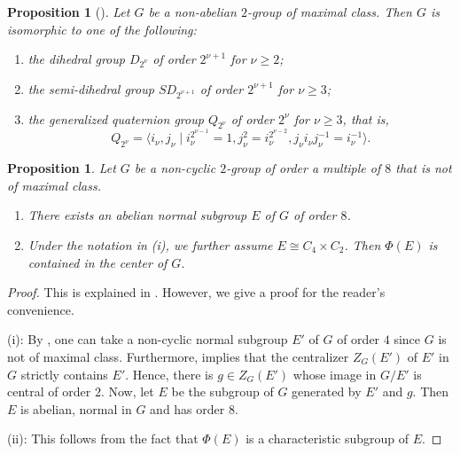 \documentclass[12pt]{amsart}
\theoremstyle{plain}
\newtheorem{prop}[thm]{Proposition}
\theoremstyle{definition}
\numberwithin{thm}{section}
\numberwithin{equation}{section}
\begin{document}
\begin{prop}[{\cite[Corollary 1.7]{Berkovich2008}}]\label{prop:clmc}
Let $G$ be a non-abelian $2$-group of maximal class. Then $G$ is isomorphic to one of the following: 
\begin{enumerate}
\item the dihedral group $D_{2^{\nu}}$ of order $2^{\nu+1}$ for $\nu \geq 2$; 
\item the semi-dihedral group $SD_{2^{\nu+1}}$ of order $2^{\nu+1}$ for $\nu \geq 3$; 
\item the generalized quaternion group $Q_{2^{\nu}}$ of order $2^{\nu}$ for $\nu \geq 3$, that is,
\begin{equation*}
    Q_{2^{\nu}}=\langle i_{\nu},j_{\nu}\mid i_{\nu}^{2^{\nu-1}}=1,j_{\nu}^{2}=i_{\nu}^{2^{\nu-2}},j_{\nu}i_{\nu}j_{\nu}^{-1}=i_{\nu}^{-1}\rangle. 
\end{equation*}
\end{enumerate}
\end{prop}

\begin{prop}\label{prop:nmne}
Let $G$ be a non-cyclic $2$-group of order a multiple of $8$ that is not of maximal class. 
\begin{enumerate}
\item There exists an abelian normal subgroup $E$ of $G$ of order $8$. 
\item Under the notation in \emph{(i)}, we further assume $E\cong C_{4}\times C_{2}$. Then $\Phi(E)$ is contained in the center of $G$.
\end{enumerate}
\end{prop}

\begin{proof}
This is explained in \cite[p.~91, Proof of Step 4]{Endo2011}. However, we give a proof for the reader's convenience. 

(i): By \cite[Lemma 1.4]{Berkovich2008}, one can take a non-cyclic normal subgroup $E'$ of $G$ of order $4$ since $G$ is not of maximal class. Furthermore, \cite[Proposition 1.8]{Berkovich2008} implies that the centralizer $Z_{G}(E')$ of $E'$ in $G$ strictly contains $E'$. Hence, there is $g\in Z_{G}(E')$ whose image in $G/E'$ is central of order $2$. Now, let $E$ be the subgroup of $G$ generated by $E'$ and $g$. Then $E$ is abelian, normal in $G$ and has order $8$. 

(ii): This follows from the fact that $\Phi(E)$ is a characteristic subgroup of $E$. 
\end{proof}
\end{document}
